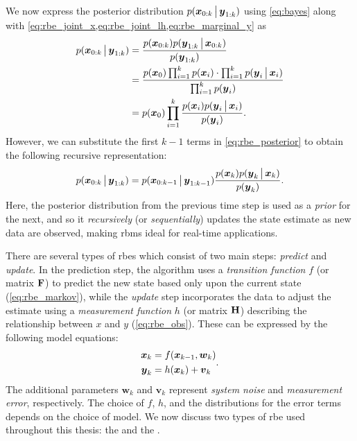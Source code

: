 We now express the posterior distribution $p(\boldsymbol x_{0:k}\,\big|\,{}\boldsymbol{y}_{1:k})$ using \cref{eq:bayes} along with \cref{eq:rbe_joint_x,eq:rbe_joint_lh,eq:rbe_marginal_y} as
\begin{equation}
\label{eq:rbe_posterior}
\begin{split}
p(\boldsymbol x_{0:k}\,\big|\,{}\boldsymbol{y}_{1:k})
&= \frac{p(\boldsymbol x_{0:k})p(\boldsymbol{y}_{1:k}\,\big|\,{}\boldsymbol x_{0:k})}{p(\boldsymbol{y}_{1:k})} \\
&= \frac{
    p(\boldsymbol x_0)\prod_{i=1}^k p(\boldsymbol x_i) \cdot
    \prod_{i=1}^k p(\boldsymbol{y}_i\,\big|\,{}\boldsymbol x_i)
}{
    \prod_{i=1}^k p(\boldsymbol{y}_i)
} \\
&= p(\boldsymbol x_0)\prod_{i=1}^k
\frac{
    p(\boldsymbol x_i) p(\boldsymbol{y}_i\,\big|\,{}\boldsymbol x_i)
}{
    p(\boldsymbol{y}_i)
}.
\end{split}
\end{equation}
However, we can substitute the first $k-1$ terms in \cref{eq:rbe_posterior} to obtain the following recursive representation:
\begin{equation}
\label{eq:rbe_posterior_recursive}
p(\boldsymbol x_{0:{k}}\,\big|\,{}\boldsymbol{y}_{1:k})
= p(\boldsymbol x_{0:k-1}\,\big|\,{}\boldsymbol{y}_{1:k-1})
\frac{
    p(\boldsymbol x_{k}) p(\boldsymbol{y}_{k}\,\big|\,{}\boldsymbol x_{k})
}{
    p(\boldsymbol{y}_{k})
}.
\end{equation}
Here, the posterior distribution from the previous time step is used as a \emph{prior} for the next, and so it \emph{recursively} (or \emph{sequentially}) updates the state estimate as new data are observed, making \glspl{rbm} ideal for real-time applications.


There are several types of \glspl{rbe} which consist of two main steps: \emph{predict} and \emph{update}. In the prediction step, the algorithm uses a \emph{transition function} $f$ (or matrix $\mathbf{F}$) to predict the new state based only upon the current state (\cref{eq:rbe_markov}), while the \emph{update} step incorporates the data to adjust the estimate using a \emph{measurement function} $h$ (or matrix $\mathbf{H}$) describing the relationship between $x$ and $y$ (\cref{eq:rbe_obs}). These can be expressed by the following model equations:
\begin{equation}
\label{eq:rbe_model}
\begin{split}
\boldsymbol x_k &= f(\boldsymbol x_{k-1}, \boldsymbol{w}_k) \\
\boldsymbol{y}_k &= h(\boldsymbol x_k) + \boldsymbol{v}_k
\end{split}.
\end{equation}
The additional parameters $\boldsymbol{w}_k$ and $\boldsymbol{v}_k$ represent \emph{system noise} and \emph{measurement error}, respectively. The choice of $f$, $h$, and the distributions for the error terms depends on the choice of model. We now discuss two types of \gls{rbe} used throughout this thesis: the \kf{} and the \pf{}.


